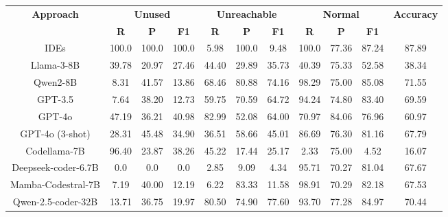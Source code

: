 \documentclass[11pt]{article}
\begin{document}
\begin{table}[h!]
\centering
\renewcommand{\arraystretch}{1} %
\setlength{\tabcolsep}{5.5pt} %
\small
\begin{tabular}{c ccc ccc ccc c}
\toprule
\multirow{2}{*}{\textbf{Approach}} & \multicolumn{3}{c}{\textbf{Unused}} & \multicolumn{3}{c}{\textbf{Unreachable}} & \multicolumn{3}{c}{\textbf{Normal}} & \multirow{2}{*}{\textbf{Accuracy}} \\
\cmidrule(lr){2-10}
 & \textbf{R} & \textbf{P} & \textbf{F1} & \textbf{R} & \textbf{P} & \textbf{F1} & \textbf{R} & \textbf{P} & \textbf{F1} & \\
\midrule

\multirow{1}{*}{IDEs} & 100.0 & 100.0 & 100.0 & 5.98 & 100.0 & 9.48 & 100.0 & 77.36 & 87.24 & 87.89\\

\midrule
\midrule
\multirow{1}{*}{Llama-3-8B} & 39.78 & 20.97 & 27.46 & 44.40 & 29.89 & 35.73 & 40.39 & 75.33 & 52.58 & 38.34 \\

\midrule
\multirow{1}{*}{Qwen2-8B} & 8.31 & 41.57 & 13.86 & 68.46 & 80.88 & 74.16 & 98.29 & 75.00 & 85.08 & 71.55\\

\midrule
\multirow{1}{*}{GPT-3.5} & 7.64 & 38.20 & 12.73 & 59.75 & 70.59 & 64.72 & 94.24 & 74.80 & 83.40 & 69.59\\

\midrule
\multirow{1}{*}{GPT-4o} & 47.19 & 36.21 & 40.98 & 82.99 & 52.08 & 64.00 & 70.97 & 84.06 & 76.96 & 60.97\\

\midrule
\multirow{1}{*}{GPT-4o (3-shot)} & 28.31 & 45.48 & 34.90 & 36.51 & 58.66 & 45.01 & 86.69 & 76.30 & 81.16 & 67.79\\

\midrule
\midrule
\multirow{1}{*}{Codellama-7B} & 96.40 & 23.87 & 38.26 & 45.22 & 17.44 & 25.17 & 2.33 & 75.00 & 4.52 & 16.07 \\

\midrule
\multirow{1}{*}{Deepseek-coder-6.7B} & 0.0 & 0.0 & 0.0 & 2.85 & 9.09 & 4.34 & 95.71 & 70.27 & 81.04 & 67.67 \\

\midrule
\multirow{1}{*}{Mamba-Codestral-7B} & 7.19 & 40.00 & 12.19 & 6.22 & 83.33 & 11.58 & 98.91 & 70.29 & 82.18 & 67.53 \\

\midrule
\multirow{1}{*}{Qwen-2.5-coder-32B} & 13.71 & 36.75 & 19.97 & 80.50 & 74.90 & 77.60 & 93.70 & 77.28 & 84.97 & 70.44\\


\end{tabular}
\end{table}
\end{document}
